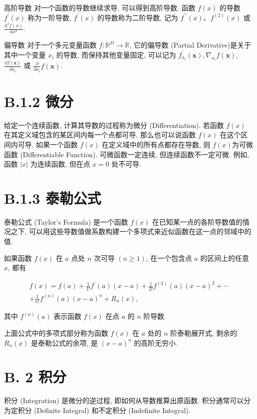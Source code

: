 \documentclass[10pt]{article}
\begin{document}
高阶导数 对一个函数的导数继续求导, 可以得到高阶导数. 函数 $f(x)$ 的导数 $f^{\prime}(x)$ 称为一阶导数, $f^{\prime}(x)$ 的导数称为二阶导数, 记为 $f^{\prime \prime}(x) 、 f^{(2)}(x)$ 或 $\frac{\mathrm{d}^{2} f(x)}{\mathrm{d} x^{2}}$.

偏导数 对于一个多元变量函数 $f: \mathbb{R}^{D} \rightarrow \mathbb{R}$, 它的偏导数 (Partial Derivative)是关于其中一个变量 $x_{i}$ 的导数, 而保持其他变量固定, 可以记为 $f_{x_{i}}^{\prime}(\boldsymbol{x}), \nabla_{x_{i}} f(\boldsymbol{x})$, $\frac{\partial f(\boldsymbol{x})}{\partial x_{i}}$ 或 $\frac{\partial}{\partial x_{i}} f(\boldsymbol{x})$.

\section*{B.1.2 微分}
给定一个连续函数, 计算其导数的过程称为微分 (Differentiation). 若函数 $f(x)$ 在其定义域包含的某区间内每一个点都可导, 那么也可以说函数 $f(x)$ 在这个区间内可导. 如果一个函数 $f(x)$ 在定义域中的所有点都存在导数, 则 $f(x)$为可微函数 (Differentiable Function). 可微函数一定连续, 但连续函数不一定可微. 例如,函数 $|x|$ 为连续函数, 但在点 $x=0$ 处不可导.

\section*{B.1.3 泰勒公式}
泰勒公式 (Taylor's Formula) 是一个函数 $f(x)$ 在已知某一点的各阶导数值的情况之下, 可以用这些导数值做系数构建一个多项式来近似函数在这一点的邻域中的值.

如果函数 $f(x)$ 在 $a$ 点处 $n$ 次可导 $(n \geq 1)$, 在一个包含点 $a$ 的区间上的任意 $x$, 都有


\begin{gather*}
f(x)=f(a)+\frac{1}{1 !} f^{\prime}(a)(x-a)+\frac{1}{2 !} f^{(2)}(a)(x-a)^{2}+\cdots \\
+\frac{1}{n !} f^{(n)}(a)(x-a)^{n}+R_{n}(x), \tag{B.2}
\end{gather*}


其中 $f^{(n)}(a)$ 表示函数 $f(x)$ 在点 $a$ 的 $n$ 阶导数.

上面公式中的多项式部分称为函数 $f(x)$ 在 $a$ 处的 $n$ 阶泰勒展开式, 剩余的 $R_{n}(x)$ 是泰勒公式的余项, 是 $(x-a)^{n}$ 的高阶无穷小.

\section*{B. 2 积分}
积分 (Integration) 是微分的逆过程, 即如何从导数推算出原函数. 积分通常可以分为定积分 (Definite Integral) 和不定积分 (Indefinite Integral).
\end{document}
